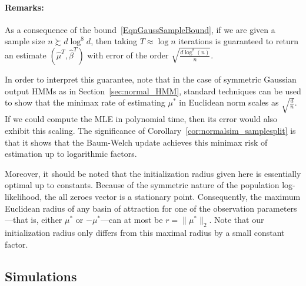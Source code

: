 \documentclass[twoside,11pt]{article}
\newcommand{\numobs}{\ensuremath{n}}
\newcommand{\usedim}{\ensuremath{d}}
\newcommand{\norm}[1]{\ensuremath{\|#1\|_2}}
\newcommand{\paramobs}{\mu}
\newcommand{\trueparamobs}{\ensuremath{\paramobs^*}}
\newcommand{\paramtrans}{\beta}
\newcommand{\paramobshat}{\widehat{\paramobs}}
\newcommand{\paramtranshat}{\widehat{\paramtrans}}
\begin{document}
\paragraph{Remarks:} 
As a consequence of the bound~\eqref{EqnGaussSampleBound}, if we are
given a sample size $\numobs \succsim \usedim \log^8 \usedim$, then
taking $T \approx \log \numobs$ iterations is guaranteed to return an
estimate $(\paramobshat^T,\paramtranshat^T)$ with error of the order
$\sqrt{\frac{\usedim \log^8(\numobs)}{\numobs}}$.

In order to interpret this guarantee, note that in the case of
symmetric Gaussian output HMMs as in Section~\ref{sec:normal_HMM},
standard techniques can be used to show that the minimax rate of
estimating $\paramobs^*$ in Euclidean norm scales as
$\sqrt{\frac{\usedim}{\numobs}}$.  If we could compute the MLE in
polynomial time, then its error would also exhibit this scaling.  The
significance of Corollary~\ref{cor:normalsim_samplesplit} is that it
shows that the Baum-Welch update achieves this minimax risk of
estimation up to logarithmic factors.

Moreover, it should be noted that the initialization radius given here
is essentially optimal up to constants. Because of the symmetric
nature of the population log-likelihood, the all zeroes vector is a
stationary point.  Consequently, the maximum Euclidean radius of any
basin of attraction for one of the observation parameters---that is,
either $\trueparamobs$ or $-\trueparamobs$---can at most be $r =
\norm{\trueparamobs}$. Note that our initialization radius only
differs from this maximal radius by a small constant factor.



\subsection{Simulations}
\end{document}

